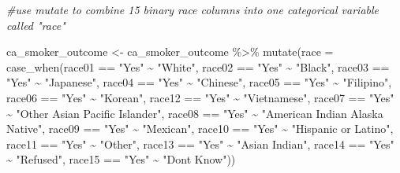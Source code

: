 \documentclass[
]{article}
\newenvironment{Shaded}{\begin{snugshade}}{\end{snugshade}}
\newcommand{\AttributeTok}[1]{\textcolor[rgb]{0.77,0.63,0.00}{#1}}
\newcommand{\CommentTok}[1]{\textcolor[rgb]{0.56,0.35,0.01}{\textit{#1}}}
\newcommand{\FunctionTok}[1]{\textcolor[rgb]{0.00,0.00,0.00}{#1}}
\newcommand{\NormalTok}[1]{#1}
\newcommand{\OtherTok}[1]{\textcolor[rgb]{0.56,0.35,0.01}{#1}}
\newcommand{\SpecialCharTok}[1]{\textcolor[rgb]{0.00,0.00,0.00}{#1}}
\newcommand{\StringTok}[1]{\textcolor[rgb]{0.31,0.60,0.02}{#1}}
\begin{document}
\newpage

\begin{Shaded}
\begin{Highlighting}[]
\CommentTok{\#use mutate to combine 15 binary race columns into one categorical variable called "race"}

\NormalTok{ca\_smoker\_outcome }\OtherTok{\textless{}{-}}\NormalTok{ ca\_smoker\_outcome }\SpecialCharTok{\%\textgreater{}\%} 
  \FunctionTok{mutate}\NormalTok{(}\AttributeTok{race =} \FunctionTok{case\_when}\NormalTok{(race01 }\SpecialCharTok{==} \StringTok{"Yes"} \SpecialCharTok{\textasciitilde{}} \StringTok{"White"}\NormalTok{,}
\NormalTok{                          race02 }\SpecialCharTok{==} \StringTok{"Yes"} \SpecialCharTok{\textasciitilde{}} \StringTok{"Black"}\NormalTok{,}
\NormalTok{                          race03 }\SpecialCharTok{==} \StringTok{"Yes"} \SpecialCharTok{\textasciitilde{}} \StringTok{"Japanese"}\NormalTok{,}
\NormalTok{                          race04 }\SpecialCharTok{==} \StringTok{"Yes"} \SpecialCharTok{\textasciitilde{}} \StringTok{"Chinese"}\NormalTok{,}
\NormalTok{                          race05 }\SpecialCharTok{==} \StringTok{"Yes"} \SpecialCharTok{\textasciitilde{}} \StringTok{"Filipino"}\NormalTok{,}
\NormalTok{                          race06 }\SpecialCharTok{==} \StringTok{"Yes"} \SpecialCharTok{\textasciitilde{}} \StringTok{"Korean"}\NormalTok{,}
\NormalTok{                          race12 }\SpecialCharTok{==} \StringTok{"Yes"} \SpecialCharTok{\textasciitilde{}} \StringTok{"Vietnamese"}\NormalTok{,}
\NormalTok{                          race07 }\SpecialCharTok{==} \StringTok{"Yes"} \SpecialCharTok{\textasciitilde{}} \StringTok{"Other Asian Pacific Islander"}\NormalTok{,}
\NormalTok{                          race08 }\SpecialCharTok{==} \StringTok{"Yes"} \SpecialCharTok{\textasciitilde{}} \StringTok{"American Indian Alaska Native"}\NormalTok{,}
\NormalTok{                          race09 }\SpecialCharTok{==} \StringTok{"Yes"} \SpecialCharTok{\textasciitilde{}} \StringTok{"Mexican"}\NormalTok{,}
\NormalTok{                          race10 }\SpecialCharTok{==} \StringTok{"Yes"} \SpecialCharTok{\textasciitilde{}} \StringTok{"Hispanic or Latino"}\NormalTok{,}
\NormalTok{                          race11 }\SpecialCharTok{==} \StringTok{"Yes"} \SpecialCharTok{\textasciitilde{}} \StringTok{"Other"}\NormalTok{,}
\NormalTok{                          race13 }\SpecialCharTok{==} \StringTok{"Yes"} \SpecialCharTok{\textasciitilde{}} \StringTok{"Asian Indian"}\NormalTok{,}
\NormalTok{                          race14 }\SpecialCharTok{==} \StringTok{"Yes"} \SpecialCharTok{\textasciitilde{}} \StringTok{"Refused"}\NormalTok{,}
\NormalTok{                          race15 }\SpecialCharTok{==} \StringTok{"Yes"} \SpecialCharTok{\textasciitilde{}} \StringTok{"Don\textquotesingle{}t Know"}\NormalTok{))}


\end{Highlighting}
\end{Shaded}
\end{document}
